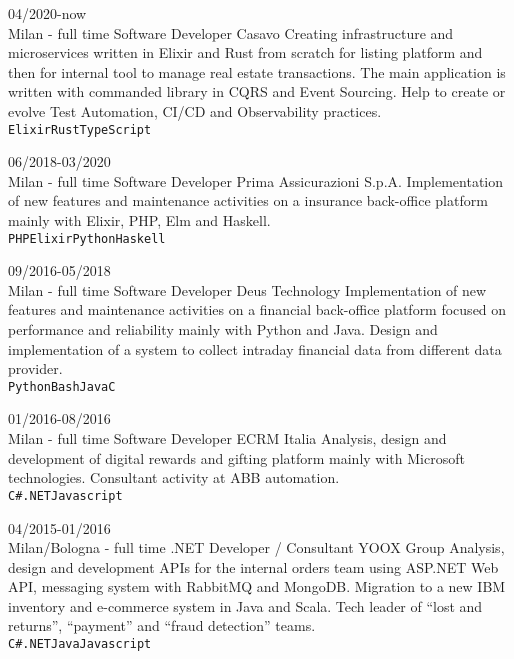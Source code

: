 \documentclass[9pt]{developercv}
\begin{document}
\begin{entrylist}
	\entry
		{04/2020-now\\\footnotesize{Milan - full time}}
		{Software Developer}
		{Casavo}
		{Creating infrastructure and microservices written in Elixir and Rust from scratch for listing platform and then for internal tool to manage real estate transactions. The main application is written with commanded library in CQRS and Event Sourcing. Help to create or evolve Test Automation, CI/CD and Observability practices.\\
	   \texttt{Elixir}\slashsep\texttt{Rust}\slashsep\texttt{TypeScript}}

	\entry
		{06/2018-03/2020\\\footnotesize{Milan - full time}}
		{Software Developer}
		{Prima Assicurazioni S.p.A.}
		{Implementation of new features and maintenance activities on a insurance back-office platform mainly with Elixir, PHP, Elm and Haskell. \\ \texttt{PHP}\slashsep\texttt{Elixir}\slashsep\texttt{Python}\slashsep\texttt{Haskell}}

	\entry
		{09/2016-05/2018\\\footnotesize{Milan - full time}}
		{Software Developer}
		{Deus Technology}
		{Implementation of new features and maintenance activities on a financial back-office platform focused on performance and reliability mainly with Python and Java. Design and implementation of a system to collect intraday financial data from different data provider. \\ \texttt{Python}\slashsep\texttt{Bash}\slashsep\texttt{Java}\slashsep\texttt{C}}

	\entry
		{01/2016-08/2016\\\footnotesize{Milan - full time}}
		{Software Developer}
		{ECRM Italia}
		{Analysis, design and development of digital rewards and gifting platform mainly with Microsoft technologies. Consultant activity at ABB automation. \\
	   \texttt{C\#}\slashsep\texttt{.NET}\slashsep\texttt{Javascript}}

	\entry
		{04/2015-01/2016\\\footnotesize{Milan/Bologna - full time}}
		{.NET Developer / Consultant}
		{YOOX Group}
		{Analysis, design and development APIs for the internal orders team using ASP.NET Web API, messaging system with RabbitMQ and MongoDB. Migration to a new IBM inventory and e-commerce system in Java and Scala. Tech leader of “lost and returns”, “payment” and “fraud detection” teams. \\
	   \texttt{C\#}\slashsep\texttt{.NET}\slashsep\texttt{Java}\slashsep\texttt{Javascript}}


\end{entrylist}
\end{document}
